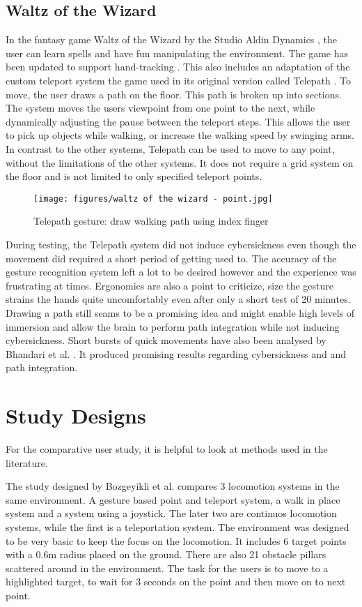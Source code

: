\subsection{Waltz of the Wizard}
In the fantasy game Waltz of the Wizard \cite{WaWizOculus} by the Studio Aldin Dynamics \cite{Aladin}, the user can learn spells and have fun manipulating the environment. The game has been updated to support hand-tracking \cite{WaWizBlog}. This also includes an adaptation of the custom teleport system the game used in its original version called Telepath \cite{WaWizTelePath}. To move, the user draws a path on the floor. This path is broken up into sections. The system moves the users viewpoint from one point to the next, while dynamically adjusting the pause between the teleport steps. This allows the user to pick up objects while walking, or increase the walking speed by swinging arms. In contrast to the other systems, Telepath can be used to move to any point, without the limitations of the other systems. It does not require a grid system on the floor and is not limited to only specified teleport points.

\begin{figure}[htb]
  \centering
  \texttt{[image: figures/waltz of the wizard - point.jpg]}
  \caption{Telepath gesture: draw walking path using index finger}
  \label{fig:telepath}
\end{figure}

During testing, the Telepath system did not induce cybersickness even though the movement did required a short period of getting used to. The accuracy of the gesture recognition system left a lot to be desired however and the experience was frustrating at times. Ergonomics are also a point to criticize, size the gesture strains the hands quite uncomfortably even after only a short test of 20 minutes. Drawing a path still seams to be a promising idea and might enable high levels of immersion and allow the brain to perform path integration while not inducing cybersickness. Short bursts of quick movements have also been analysed by Bhandari et al. \cite{Bhandari}. It produced promising results regarding cybersickness and and path integration. 

\section{Study Designs}
For the comparative user study, it is helpful to look at methods used in the literature. 


The study designed by Bozgeyikli et al. \cite{bozgeyikli} compares 3 locomotion systems in the same environment. A gesture based point and teleport system, a walk in place system and a system using a joystick. The later two are continuos locomotion systems, while the first is a teleportation system. The environment was designed to be very basic to keep the focus on the locomotion. It includes 6 target points with a 0.6m radius placed on the ground. There are also 21 obstacle pillars scattered around in the environment. The task for the users is to move to a highlighted target, to wait for 3 seconds on the point and then move on to next point.

